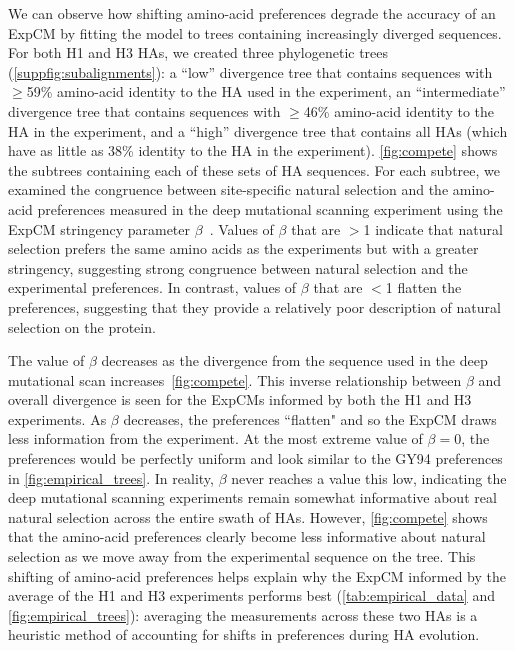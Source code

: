 \documentclass[11pt]{article}
\begin{document}
We can observe how shifting amino-acid preferences degrade the accuracy of an ExpCM by fitting the model to trees containing increasingly diverged sequences.
For both H1 and H3 HAs, we created three phylogenetic trees (\ref{suppfig:subalignments}): a ``low'' divergence tree that contains sequences with $\ge$59\% amino-acid identity to the HA used in the experiment, an ``intermediate'' divergence tree that contains sequences with $\ge$46\% amino-acid identity to the HA in the experiment, and a ``high'' divergence tree that contains all HAs (which have as little as 38\% identity to the HA in the experiment).
\ref{fig:compete} shows the subtrees containing each of these sets of HA sequences.
For each subtree, we examined the congruence between site-specific natural selection and the amino-acid preferences measured in the deep mutational scanning experiment using the ExpCM stringency parameter $\beta$~\citep{bloom2014informed,hilton2017phydms}. 
Values of $\beta$ that are $>$1 indicate that natural selection prefers the same amino acids as the experiments but with a greater stringency, suggesting strong congruence between natural selection and the experimental preferences. 
In contrast, values of $\beta$ that are $<$1 flatten the preferences, suggesting that they provide a relatively poor description of natural selection on the protein.

The value of $\beta$ decreases as the divergence from the sequence used in the deep mutational scan increases~\ref{fig:compete}. 
This inverse relationship between $\beta$ and overall divergence is seen for the ExpCMs informed by both the H1 and H3 experiments.
As $\beta$ decreases, the preferences ``flatten" and so the ExpCM draws less information from the experiment. 
At the most extreme value of $\beta = 0$, the preferences would be perfectly uniform and look similar to the GY94 preferences in \ref{fig:empirical_trees}.
In reality, $\beta$ never reaches a value this low, indicating the deep mutational scanning experiments remain somewhat informative about real natural selection across the entire swath of HAs. 
However, \ref{fig:compete} shows that the amino-acid preferences clearly become less informative about natural selection as we move away from the experimental sequence on the tree.
This shifting of amino-acid preferences helps explain why the ExpCM informed by the average of the H1 and H3 experiments performs best (\ref{tab:empirical_data} and \ref{fig:empirical_trees}): averaging the measurements across these two HAs is a heuristic method of accounting for shifts in preferences during HA evolution. 
 
\end{document}
